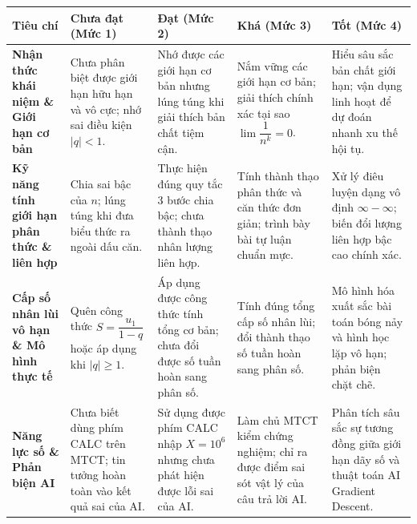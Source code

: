 \documentclass[12pt, a4paper]{article}
\begin{document}
\begin{center}
\small
\begin{tabularx}{\textwidth}{|p{2.8cm}|X|X|X|X|}
\hline
\textbf{Tiêu chí} & \textbf{Chưa đạt (Mức 1)} & \textbf{Đạt (Mức 2)} & \textbf{Khá (Mức 3)} & \textbf{Tốt (Mức 4)} \\ \hline
\textbf{Nhận thức khái niệm \& Giới hạn cơ bản} & Chưa phân biệt được giới hạn hữu hạn và vô cực; nhớ sai điều kiện $|q| < 1$. & Nhớ được các giới hạn cơ bản nhưng lúng túng khi giải thích bản chất tiệm cận. & Nắm vững các giới hạn cơ bản; giải thích chính xác tại sao $\lim \dfrac{1}{n^k} = 0$. & Hiểu sâu sắc bản chất giới hạn; vận dụng linh hoạt để dự đoán nhanh xu thế hội tụ. \\ \hline
\textbf{Kỹ năng tính giới hạn phân thức \& liên hợp} & Chia sai bậc của $n$; lúng túng khi đưa biểu thức ra ngoài dấu căn. & Thực hiện đúng quy tắc 3 bước chia bậc; chưa thành thạo nhân lượng liên hợp. & Tính thành thạo phân thức và căn thức đơn giản; trình bày bài tự luận chuẩn mực. & Xử lý điêu luyện dạng vô định $\infty - \infty$; biến đổi lượng liên hợp bậc cao chính xác. \\ \hline
\textbf{Cấp số nhân lùi vô hạn \& Mô hình thực tế} & Quên công thức $S = \dfrac{u_1}{1 - q}$ hoặc áp dụng khi $|q| \ge 1$. & Áp dụng được công thức tính tổng cơ bản; chưa đổi được số tuần hoàn sang phân số. & Tính đúng tổng cấp số nhân lùi; đổi thành thạo số tuần hoàn sang phân số. & Mô hình hóa xuất sắc bài toán bóng nảy và hình học lặp vô hạn; phản biện chặt chẽ. \\ \hline
\textbf{Năng lực số \& Phản biện AI} & Chưa biết dùng phím CALC trên MTCT; tin tưởng hoàn toàn vào kết quả sai của AI. & Sử dụng được phím CALC nhập $X = 10^6$ nhưng chưa phát hiện được lỗi sai của AI. & Làm chủ MTCT kiểm chứng nghiệm; chỉ ra được điểm sai sót vật lý của câu trả lời AI. & Phân tích sâu sắc sự tương đồng giữa giới hạn dãy số và thuật toán AI Gradient Descent. \\ \hline
\end{tabularx}
\end{center}
\end{document}
